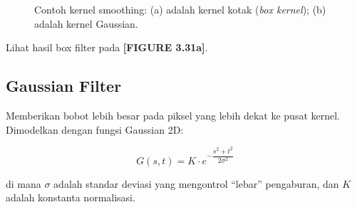 \documentclass[12pt,a4paper]{article}
\begin{document}
\begin{figure}[htbp]
\centering
{}

\caption{Contoh kernel smoothing: (a) adalah kernel kotak (\textit{box kernel}); (b) adalah kernel Gaussian.}
\label{fig:gambar3.31}

\end{figure}

Lihat hasil box filter pada \textbf{[FIGURE 3.31a]}.

\subsection{Gaussian Filter}

Memberikan bobot lebih besar pada piksel yang lebih dekat ke pusat kernel. Dimodelkan dengan fungsi Gaussian 2D:

\begin{equation}
  G(s,t) = K \cdot e^{-\dfrac{s^2 + t^2}{2\sigma^2}}
  \label{eq:gaussian_function}
\end{equation}

di mana $\sigma$ adalah standar deviasi yang mengontrol ``lebar'' pengaburan, dan $K$ adalah konstanta normalisasi.
\end{document}
